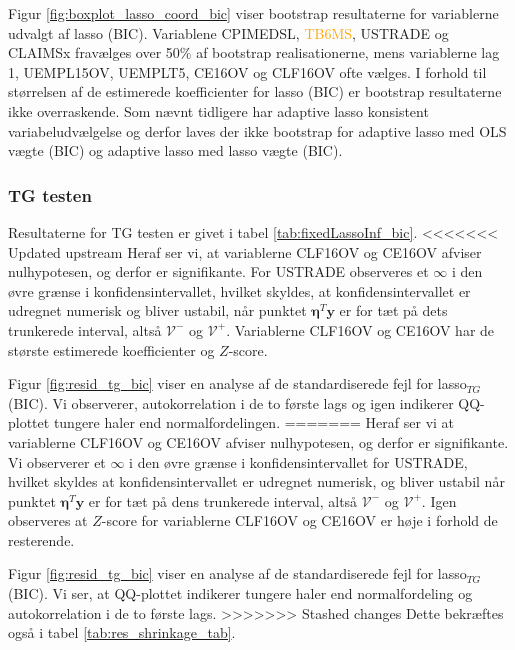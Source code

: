 Figur \ref{fig:boxplot_lasso_coord_bic} viser bootstrap resultaterne for variablerne udvalgt af lasso (BIC).
Variablene \textcolor{cadetblue2}{CPIMEDSL}, \textcolor{orange}{TB6MS}, \textcolor{blue3}{USTRADE} og \textcolor{blue3}{CLAIMSx} fravælges over 50\% af bootstrap realisationerne, mens variablerne \textcolor{blue3}{lag 1}, \textcolor{blue3}{UEMPL15OV}, \textcolor{blue3}{UEMPLT5}, \textcolor{blue3}{CE16OV} og \textcolor{blue3}{CLF16OV} ofte vælges.
I forhold til størrelsen af de estimerede koefficienter for lasso (BIC) er bootstrap resultaterne ikke overraskende. 
Som nævnt tidligere har adaptive lasso konsistent variabeludvælgelse og derfor laves der ikke bootstrap for adaptive lasso med OLS vægte (BIC) og adaptive lasso med lasso vægte (BIC). 

\subsubsection{TG testen}
Resultaterne for TG testen er givet i tabel \ref{tab:fixedLassoInf_bic}.
<<<<<<< Updated upstream
Heraf ser vi, at variablerne \textcolor{blue3}{CLF16OV} og \textcolor{blue3}{CE16OV} afviser nulhypotesen, og derfor er signifikante.
For \textcolor{blue3}{USTRADE} observeres et $\infty$ i den øvre grænse i konfidensintervallet, hvilket skyldes, at konfidensintervallet er udregnet numerisk og bliver ustabil, når punktet $\boldsymbol\eta^T \mathbf{y}$ er for tæt på dets trunkerede interval, altså $\mathcal{V}^-$ og $\mathcal{V}^+$. 
Variablerne \textcolor{blue3}{CLF16OV} og \textcolor{blue3}{CE16OV} har de største estimerede koefficienter og $Z$-score.

Figur \ref{fig:resid_tg_bic} viser en analyse af de standardiserede fejl for lasso$_{TG}$ (BIC). 
Vi observerer, autokorrelation i de to første lags og igen indikerer QQ-plottet tungere haler end normalfordelingen. 
=======
Heraf ser vi at variablerne \textcolor{blue3}{CLF16OV} og \textcolor{blue3}{CE16OV} afviser nulhypotesen, og derfor er signifikante.
Vi observerer et $\infty$ i den øvre grænse i konfidensintervallet for \textcolor{blue3}{USTRADE}, hvilket skyldes at konfidensintervallet er udregnet numerisk, og bliver ustabil når punktet $\boldsymbol\eta^T \mathbf{y}$ er for tæt på dens trunkerede interval, altså $\mathcal{V}^-$ og $\mathcal{V}^+$. 
Igen observeres at $Z$-score for variablerne \textcolor{blue3}{CLF16OV} og \textcolor{blue3}{CE16OV} er høje i forhold de resterende. 

Figur \ref{fig:resid_tg_bic} viser en analyse af de standardiserede fejl for lasso$_{TG}$ (BIC). Vi ser, at QQ-plottet indikerer tungere haler end normalfordeling og autokorrelation i de to første lags. 
>>>>>>> Stashed changes
Dette bekræftes også i tabel \ref{tab:res_shrinkage_tab}.




